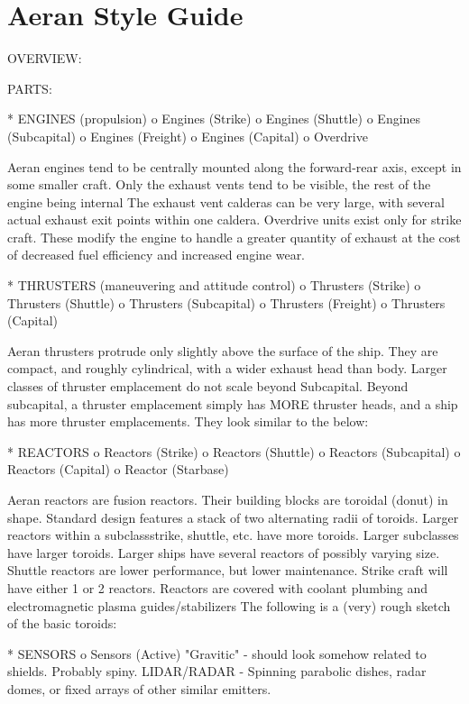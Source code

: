 \section{Aeran Style Guide}
OVERVIEW:


PARTS:

    * ENGINES (propulsion)
          o Engines (Strike)
          o Engines (Shuttle)
          o Engines (Subcapital)
          o Engines (Freight)
          o Engines (Capital)
          o Overdrive


Aeran engines tend to be centrally mounted along the forward-rear axis, except in some smaller craft.
Only the exhaust vents tend to be visible, the rest of the engine being internal
The exhaust vent calderas can be very large, with several actual exhaust exit points within one caldera.
Overdrive units exist only for strike craft. These modify the engine to handle a greater quantity of exhaust at the cost of decreased fuel efficiency and increased engine wear.


    * THRUSTERS (maneuvering and attitude control)
          o Thrusters (Strike)
          o Thrusters (Shuttle)
          o Thrusters (Subcapital)
          o Thrusters (Freight)
          o Thrusters (Capital)


Aeran thrusters protrude only slightly above the surface of the ship.
They are compact, and roughly cylindrical, with a wider exhaust head than body.
Larger classes of thruster emplacement do not scale beyond Subcapital. Beyond subcapital, a thruster emplacement simply has MORE thruster heads, and a ship has more thruster emplacements.
They look similar to the below:



    * REACTORS
          o Reactors (Strike)
          o Reactors (Shuttle)
          o Reactors (Subcapital)
          o Reactors (Capital)
          o Reactor (Starbase)


Aeran reactors are fusion reactors.
Their building blocks are toroidal (donut) in shape. Standard design features a stack of two alternating radii of toroids.
Larger reactors within a subclass{strike, shuttle, etc.} have more toroids.
Larger subclasses have larger toroids.
Larger ships have several reactors of possibly varying size.
Shuttle reactors are lower performance, but lower maintenance.
Strike craft will have either 1 or 2 reactors.
Reactors are covered with coolant plumbing and electromagnetic plasma guides/stabilizers
The following is a (very) rough sketch of the basic toroids:


    * SENSORS
          o Sensors (Active)
            "Gravitic" - should look somehow related to shields. Probably spiny.
            LIDAR/RADAR - Spinning parabolic dishes, radar domes, or fixed arrays of other similar emitters.

